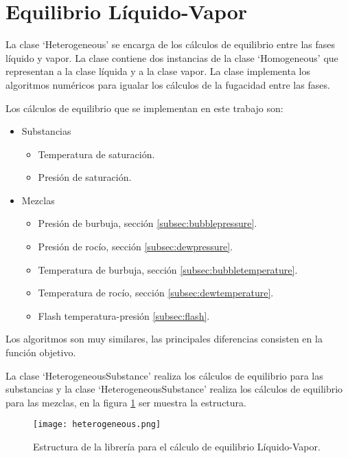 \section{Equilibrio Líquido-Vapor}\label{sec:heterogeneous}

	La clase `Heterogeneous' se encarga de los cálculos de equilibrio entre las fases líquido y vapor. La clase contiene dos instancias de la clase `Homogeneous' que representan a la clase líquida y a la clase vapor. La clase implementa los algoritmos numéricos para igualar los cálculos de la fugacidad entre las fases.

	Los cálculos de equilibrio que se implementan en este trabajo son:

	\begin{itemize}

		\item Substancias
			\begin{itemize}
				\item Temperatura de saturación.
				\item Presión de saturación.
			\end{itemize}

		\item Mezclas
	\begin{itemize}
		\item Presión de burbuja, sección \ref{subsec:bubblepressure}.
		\item Presión de rocío, sección \ref{subsec:dewpressure}.
		\item Temperatura de burbuja, sección \ref{subsec:bubbletemperature}.
		\item Temperatura de rocío, sección \ref{subsec:dewtemperature}.
		\item Flash temperatura-presión \ref{subsec:flash}.
	\end{itemize}

	\end{itemize}

	Los algoritmos son muy similares, las principales diferencias consisten en la función objetivo.

	La clase `HeterogeneousSubstance' realiza los cálculos de equilibrio para las substancias y la clase `HeterogeneousSubstance' realiza los cálculos de equilibrio para las mezclas, en la figura \ref{fig:heterogeneous} ser muestra la estructura.

\begin{figure}[!h]
  \centering
    \texttt{[image: heterogeneous.png]}
    \caption{Estructura de la librería para el cálculo de equilibrio Líquido-Vapor.}
    \label{fig:heterogeneous}
\end{figure}

